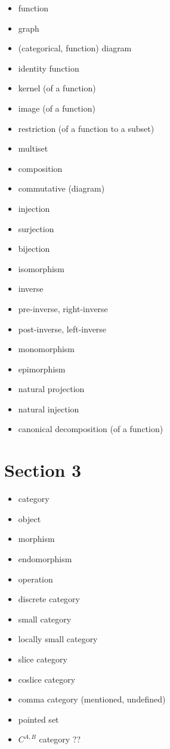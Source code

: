 \documentclass[12pt, letterpaper, twoside]{report}
\begin{document}
\begin{itemize}
	\item function
	\item graph
	\item (categorical, function) diagram
	\item identity function
	\item kernel (of a function)
	\item image (of a function)
	\item restriction (of a function to a subset)
	\item multiset
	\item composition
	\item commutative (diagram)
	\item injection
	\item surjection
	\item bijection
	\item isomorphism
	\item inverse
	\item pre-inverse, right-inverse
	\item post-inverse, left-inverse
	\item monomorphism
	\item epimorphism
	\item natural projection
	\item natural injection
	\item canonical decomposition (of a function)
\end{itemize}


\section*{Section 3}

\begin{itemize}
	\item category
	\item object
	\item morphism
	\item endomorphism
	\item operation
	\item discrete category
	\item small category
	\item locally small category
	\item slice category
	\item coslice category
	\item comma category (mentioned, undefined)
	\item pointed set
	\item $C^{A, B}$ category ??
\end{itemize}
\end{document}
